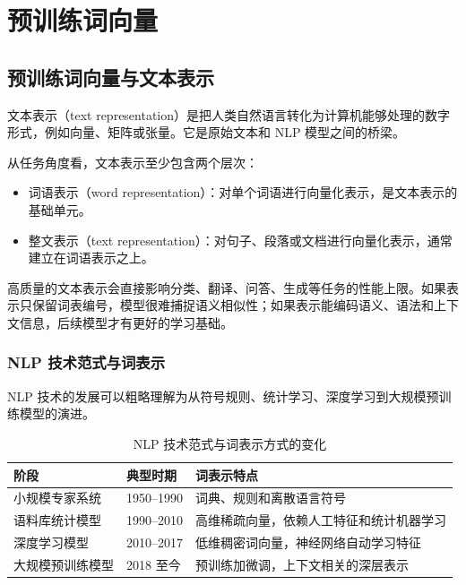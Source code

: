 \chapter{预训练词向量}

\section{预训练词向量与文本表示}

文本表示（text representation）是把人类自然语言转化为计算机能够处理的数字形式，例如向量、矩阵或张量。它是原始文本和 NLP 模型之间的桥梁。

从任务角度看，文本表示至少包含两个层次：
\begin{itemize}
  \item 词语表示（word representation）：对单个词语进行向量化表示，是文本表示的基础单元。
  \item 整文表示（text representation）：对句子、段落或文档进行向量化表示，通常建立在词语表示之上。
\end{itemize}

高质量的文本表示会直接影响分类、翻译、问答、生成等任务的性能上限。如果表示只保留词表编号，模型很难捕捉语义相似性；如果表示能编码语义、语法和上下文信息，后续模型才有更好的学习基础。

\subsection{NLP 技术范式与词表示}

NLP 技术的发展可以粗略理解为从符号规则、统计学习、深度学习到大规模预训练模型的演进。

\begin{table}[H]
\centering
\small
\begin{tabular}{|p{}|p{}|p{}|}
\hline
阶段 & 典型时期 & 词表示特点 \\ \hline
小规模专家系统 & 1950--1990 & 词典、规则和离散语言符号 \\ \hline
语料库统计模型 & 1990--2010 & 高维稀疏向量，依赖人工特征和统计机器学习 \\ \hline
深度学习模型 & 2010--2017 & 低维稠密词向量，神经网络自动学习特征 \\ \hline
大规模预训练模型 & 2018 至今 & 预训练加微调，上下文相关的深层表示 \\ \hline
\end{tabular}
\caption{NLP 技术范式与词表示方式的变化}
\end{table}

